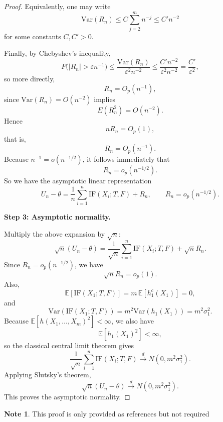 \documentclass[11pt]{article}
\theoremstyle{definition}
\newtheorem{note}{Note}[section]
\begin{document}
\begin{proof}
Equivalently, one may write
\[
\mathrm{Var}(R_n)\le C\sum_{j=2}^m n^{-j}\le C' n^{-2}
\]
for some constants \(C,C'>0\).

Finally, by Chebyshev's inequality,
\[
P\bigl(|R_n|>\varepsilon n^{-1}\bigr)
\le
\frac{\mathrm{Var}(R_n)}{\varepsilon^2 n^{-2}}
\le
\frac{C'n^{-2}}{\varepsilon^2 n^{-2}}
=
\frac{C'}{\varepsilon^2},
\]
so more directly,
\[
R_n=O_p(n^{-1}),
\]
since \(\mathrm{Var}(R_n)=O(n^{-2})\) implies
\[
E(R_n^2)=O(n^{-2}).
\]
Hence
\[
nR_n=O_p(1),
\]
that is,
\[
R_n=O_p(n^{-1}).
\]
Because \(n^{-1}=o(n^{-1/2})\), it follows immediately that
\[
R_n=o_p(n^{-1/2}).
\]
So we have the asymptotic linear representation
\[
U_n-\theta
=
\frac{1}{n}\sum_{i=1}^n \mathrm{IF}(X_i;T,F)+R_n,
\qquad
R_n=o_p(n^{-1/2}).
\]

\medskip
\noindent
\textbf{Step 3: Asymptotic normality.}

Multiply the above expansion by $\sqrt{n}$:
\[
\sqrt{n}(U_n-\theta)
=
\frac{1}{\sqrt{n}}\sum_{i=1}^n \mathrm{IF}(X_i;T,F)
+
\sqrt{n}R_n.
\]
Since $R_n=o_p(n^{-1/2})$, we have
\[
\sqrt{n}R_n=o_p(1).
\]
Also,
\[
\mathbb{E}[\mathrm{IF}(X_1;T,F)]
=
m\,\mathbb{E}[h_1^c(X_1)]
=0,
\]
and
\[
\mathrm{Var}(\mathrm{IF}(X_1;T,F))
=
m^2\mathrm{Var}(h_1(X_1))
=
m^2\sigma_1^2.
\]
Because $\mathbb{E}[h(X_1,\dots,X_m)^2]<\infty$, we also have
\[
\mathbb{E}[h_1(X_1)^2]<\infty,
\]
so the classical central limit theorem gives
\[
\frac{1}{\sqrt{n}}\sum_{i=1}^n \mathrm{IF}(X_i;T,F)
\xrightarrow{d}
N(0,m^2\sigma_1^2).
\]
Applying Slutsky's theorem,
\[
\sqrt{n}(U_n-\theta)
\xrightarrow{d}
N(0,m^2\sigma_1^2).
\]
This proves the asymptotic normality.
\end{proof}
\begin{note}
    This proof is only provided as references but not required
\end{note}
\end{document}
